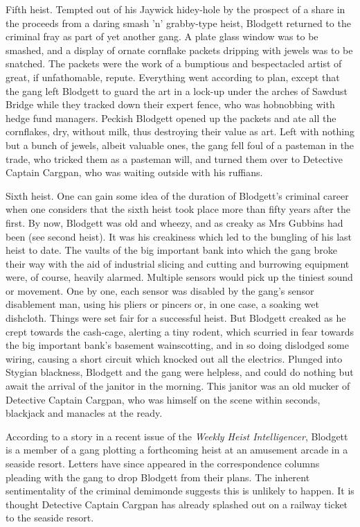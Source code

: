 Fifth heist. Tempted out of his Jaywick hidey-hole by the prospect of a share in the proceeds from a daring smash 'n' grabby-type heist, Blodgett returned to the criminal fray as part of yet another gang. A plate glass window was to be smashed, and a display of ornate cornflake packets dripping with jewels was to be snatched. The packets were the work of a bumptious and bespectacled artist of great, if unfathomable, repute. Everything went according to plan, except that the gang left Blodgett to guard the art in a lock-up under the arches of Sawdust Bridge while they tracked down their expert fence, who was hobnobbing with hedge fund managers. Peckish Blodgett opened up the packets and ate all the cornflakes, dry, without milk, thus destroying their value as art. Left with nothing but a bunch of jewels, albeit valuable ones, the gang fell foul of a pasteman in the trade, who tricked them as a pasteman will, and turned them over to Detective Captain Cargpan, who was waiting outside with his ruffians.

Sixth heist. One can gain some idea of the duration of Blodgett's criminal career when one considers that the sixth heist took place more than fifty years after the first. By now, Blodgett was old and wheezy, and as creaky as Mrs Gubbins had been (see second heist). It was his creakiness which led to the bungling of his last heist to date. The vaults of the big important bank into which the gang broke their way with the aid of industrial slicing and cutting and burrowing equipment were, of course, heavily alarmed. Multiple sensors would pick up the tiniest sound or movement. One by one, each sensor was disabled by the gang's sensor disablement man, using his pliers or pincers or, in one case, a soaking wet dishcloth. Things were set fair for a successful heist. But Blodgett creaked as he crept towards the cash-cage, alerting a tiny rodent, which scurried in fear towards the big important bank's basement wainscotting, and in so doing dislodged some wiring, causing a short circuit which knocked out all the electrics. Plunged into Stygian blackness, Blodgett and the gang were helpless, and could do nothing but await the arrival of the janitor in the morning. This janitor was an old mucker of Detective Captain Cargpan, who was himself on the scene within seconds, blackjack and manacles at the ready.

According to a story in a recent issue of the \emph{Weekly Heist Intelligencer}, Blodgett is a member of a gang plotting a forthcoming heist at an amusement arcade in a seaside resort. Letters have since appeared in the correspondence columns pleading with the gang to drop Blodgett from their plans. The inherent sentimentality of the criminal demimonde suggests this is unlikely to happen. It is thought Detective Captain Cargpan has already splashed out on a railway ticket to the seaside resort.